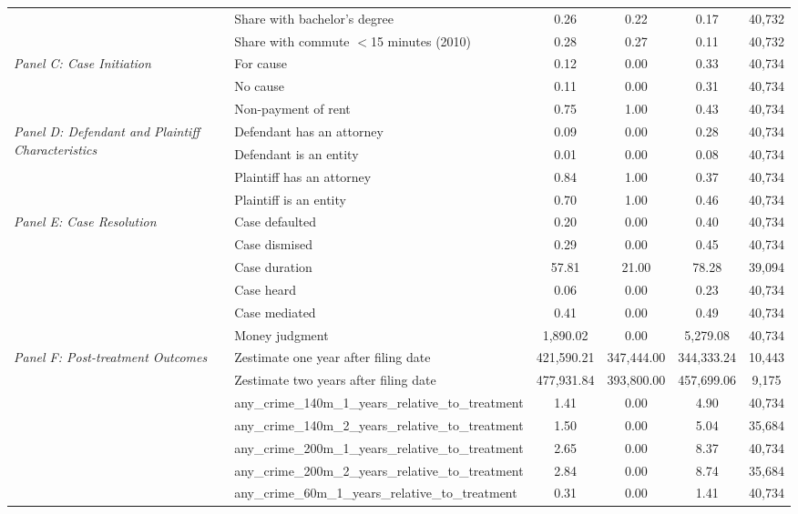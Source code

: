 \begin{tabular}{llcccc}
 & Share with bachelor's degree & 0.26 & 0.22 & 0.17 & 40,732 \\
 & Share with commute $<$15 minutes (2010) & 0.28 & 0.27 & 0.11 & 40,732 \\
\cline{1-6}
\multirow[c]{3}{4cm}{\textit{Panel C: Case Initiation}} & For cause & 0.12 & 0.00 & 0.33 & 40,734 \\
 & No cause & 0.11 & 0.00 & 0.31 & 40,734 \\
 & Non-payment of rent & 0.75 & 1.00 & 0.43 & 40,734 \\
\cline{1-6}
\multirow[c]{4}{4cm}{\textit{Panel D: Defendant and Plaintiff Characteristics}} & Defendant has an attorney & 0.09 & 0.00 & 0.28 & 40,734 \\
 & Defendant is an entity & 0.01 & 0.00 & 0.08 & 40,734 \\
 & Plaintiff has an attorney & 0.84 & 1.00 & 0.37 & 40,734 \\
 & Plaintiff is an entity & 0.70 & 1.00 & 0.46 & 40,734 \\
\cline{1-6}
\multirow[c]{6}{4cm}{\textit{Panel E: Case Resolution}} & Case defaulted & 0.20 & 0.00 & 0.40 & 40,734 \\
 & Case dismised & 0.29 & 0.00 & 0.45 & 40,734 \\
 & Case duration & 57.81 & 21.00 & 78.28 & 39,094 \\
 & Case heard & 0.06 & 0.00 & 0.23 & 40,734 \\
 & Case mediated & 0.41 & 0.00 & 0.49 & 40,734 \\
 & Money judgment & 1,890.02 & 0.00 & 5,279.08 & 40,734 \\
\cline{1-6}
\multirow[c]{14}{4cm}{\textit{Panel F: Post-treatment Outcomes}} & Zestimate one year after filing date & 421,590.21 & 347,444.00 & 344,333.24 & 10,443 \\
 & Zestimate two years after filing date & 477,931.84 & 393,800.00 & 457,699.06 & 9,175 \\
 & any_crime_140m_1_years_relative_to_treatment & 1.41 & 0.00 & 4.90 & 40,734 \\
 & any_crime_140m_2_years_relative_to_treatment & 1.50 & 0.00 & 5.04 & 35,684 \\
 & any_crime_200m_1_years_relative_to_treatment & 2.65 & 0.00 & 8.37 & 40,734 \\
 & any_crime_200m_2_years_relative_to_treatment & 2.84 & 0.00 & 8.74 & 35,684 \\
 & any_crime_60m_1_years_relative_to_treatment & 0.31 & 0.00 & 1.41 & 40,734 \\

\end{tabular}

